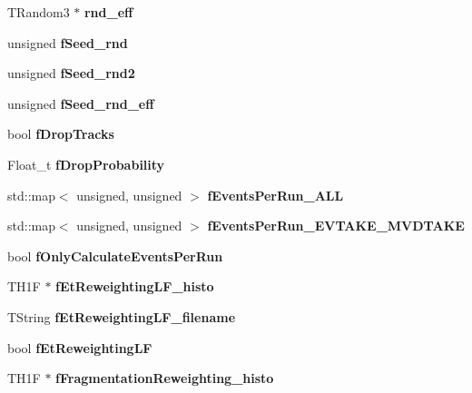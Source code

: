 \begin{CompactItemize}
\item 
TRandom3 $\ast$ \textbf{rnd\_\-eff}\label{classTMiniNtupleAnalyzer_c663e958b428a3e7fc82574556ac4410}

\item 
unsigned \textbf{f\-Seed\_\-rnd}\label{classTMiniNtupleAnalyzer_157ce77acdb78e89b5b624997953dbed}

\item 
unsigned \textbf{f\-Seed\_\-rnd2}\label{classTMiniNtupleAnalyzer_895545cc133bc8a25fc9ecd075dc8f82}

\item 
unsigned \textbf{f\-Seed\_\-rnd\_\-eff}\label{classTMiniNtupleAnalyzer_a3a15d4f1a7dab0b2d6e15ae44e0c39c}

\item 
bool \textbf{f\-Drop\-Tracks}\label{classTMiniNtupleAnalyzer_a3bb463a80509166638e0fbd7ad44a4e}

\item 
Float\_\-t \textbf{f\-Drop\-Probability}\label{classTMiniNtupleAnalyzer_45954a7e9516b124d3810381bc0a6cd5}

\item 
std::map$<$ unsigned, unsigned $>$ \textbf{f\-Events\-Per\-Run\_\-ALL}\label{classTMiniNtupleAnalyzer_4ad69c6cee3e08c3a9af9a68f2bdcec4}

\item 
std::map$<$ unsigned, unsigned $>$ \textbf{f\-Events\-Per\-Run\_\-EVTAKE\_\-MVDTAKE}\label{classTMiniNtupleAnalyzer_3cc76aa4175012565fe3eecd2c892717}

\item 
bool \textbf{f\-Only\-Calculate\-Events\-Per\-Run}\label{classTMiniNtupleAnalyzer_62fa5db0fa71ff8e84215b2e673d4b35}

\item 
TH1F $\ast$ \textbf{f\-Et\-Reweighting\-LF\_\-histo}\label{classTMiniNtupleAnalyzer_f800389e731788a3e81526879b6d9443}

\item 
TString \textbf{f\-Et\-Reweighting\-LF\_\-filename}\label{classTMiniNtupleAnalyzer_4df3a9b546c3fc0bf3ff40c92db308c1}

\item 
bool \textbf{f\-Et\-Reweighting\-LF}\label{classTMiniNtupleAnalyzer_88b17291ea3e29036cb98355e95f9367}

\item 
TH1F $\ast$ \textbf{f\-Fragmentation\-Reweighting\_\-histo}\label{classTMiniNtupleAnalyzer_6b10478218a36e623c128e762fa12e5a}


\end{CompactItemize}

